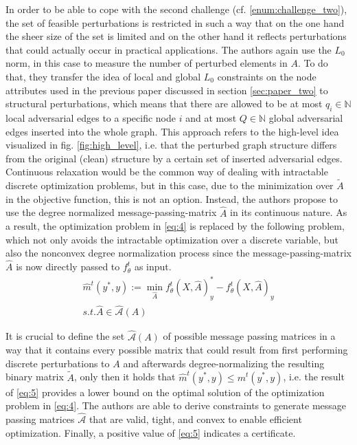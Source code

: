 \documentclass[a4paper,preprint]{sig-alternate}
\begin{document}
In order to be able to cope with the second challenge (cf. \ref{enum:challenge_two}), the set of feasible perturbations
is restricted in such a way that on the one hand the sheer size of the set is limited and on the other hand
it reflects perturbations that could actually occur in practical applications. \cite{10.1145/3394486.3403217}
The authors again use the $L_0$ norm, in this case to measure the number of perturbed elements in $A$.
To do that, they transfer the idea of local and global $L_0$ constraints on the node attributes used in the previous paper 
discussed in section \ref{sec:paper_two} to structural perturbations, which means that there are allowed to be at most
$q_i \in \mathbb{N}$ local adversarial edges to a specific node $i$ and at most $Q \in \mathbb{N}$ global adversarial
edges inserted into the whole graph. \cite{10.1145/3394486.3403217}
This approach refers to the high-level idea visualized in fig. \ref{fig:high_level}, i.e. that the perturbed graph structure
differs from the original (clean) structure by a certain set of inserted adversarial edges.\newline
Continuous relaxation would be the common way of dealing with intractable discrete optimization problems,
but in this case, due to the minimization over $\tilde{A}$ in the objective function, this is not an option. \cite{10.1145/3394486.3403217}
Instead, the authors propose to use the degree normalized message-passing-matrix $\hat{A}$ in its continuous nature.
As a result, the optimization problem in \ref{eq:4} is replaced by the following problem, which not only avoids 
the intractable optimization over a discrete variable, but also the nonconvex degree normalization process
since the message-passing-matrix $\hat{A}$ is now directly passed to $f_{\theta}^t$ as input. \cite{10.1145/3394486.3403217}
\begin{gather}
\label{eq:5}
    \hat{m}^t (y^{\ast}, y) := \min_{\hat{A}} f_{\theta}^t (X, \hat{A})_y^{\ast}
    - f_{\theta}^t (X, \hat{A})_y \\
    s.t. \hat{A} \in \mathcal{\hat{A}}(A) \nonumber
\end{gather}

\vfill
\pagebreak

It is crucial to define the set $\mathcal{\hat{A}}(A)$ of possible message passing matrices in a way that it contains
every possible matrix that could result from first performing discrete perturbations to $A$ and afterwards 
degree-normalizing the resulting binary matrix $\tilde{A}$, only then it holds that $\hat{m}^t (y^{\ast}, y) \leq m^t (y^{\ast}, y)$, 
i.e. the result of \ref{eq:5} provides a lower bound on the optimal solution of the optimization problem in \ref{eq:4}. \cite{10.1145/3394486.3403217}
The authors are able to derive constraints to generate message passing matrices $\mathcal{\hat{A}}$
that are valid, tight, and convex to enable efficient optimization.
Finally, a positive value of \ref{eq:5} indicates a certificate. \cite{10.1145/3394486.3403217} \newline
\end{document}
